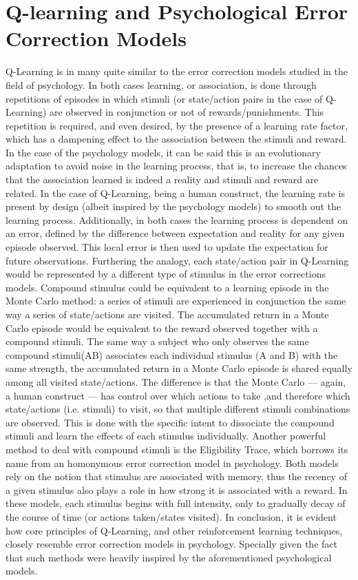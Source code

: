 \documentclass[10pt]{article}
\begin{document}
\section{Q-learning and Psychological Error Correction Models}

    Q-Learning is in many quite similar to the error correction models studied in the field of psychology. In both cases learning, or association, is done through repetitions of episodes in which stimuli (or state/action pairs in the case of Q-Learning) are observed in conjunction or not of rewards/punishments. This repetition is required, and even desired, by the presence of a learning rate factor, which has a dampening effect to the association between the stimuli and reward. In the case of the psychology models, it can be said this is an evolutionary adaptation to avoid noise in the learning process, that is, to increase the chances that the association learned is indeed a reality and stimuli and reward are related. In the case of Q-Learning, being a human construct, the learning rate is present by design (albeit inspired by the psychology models) to smooth out the learning process. Additionally, in both cases the learning process is dependent on an error, defined by the difference between expectation and reality for any given episode observed. This local error is then used to update the expectation for future observations. Furthering the analogy, each state/action pair in Q-Learning would be represented by a different type of stimulus in the error corrections models. Compound stimulus could be equivalent to a learning episode in the Monte Carlo method: a series of stimuli are experienced in conjunction the same way a series of state/actions are visited. The accumulated return in a Monte Carlo episode would be equivalent to the reward observed together with a compound stimuli. The same way a subject who only observes the same compound stimuli(AB) associates each individual stimulus (A and B) with the same strength, the accumulated return in a Monte Carlo episode is shared equally among all visited state/actions. The difference is that the Monte Carlo — again, a human construct — has control over which actions to take ,and therefore which state/actions (i.e. stimuli) to visit, so that multiple different stimuli combinations are observed. This is done with the specific intent to dissociate the compound stimuli and learn the effects of each stimulus individually. Another powerful method to deal with compound stimuli is the Eligibility Trace, which borrows its name from an homonymous error correction model in psychology. Both models rely on the notion that stimulus are associated with memory, thus the recency of a given stimulus also plays a role in how strong it is associated with a reward. In these models, each stimulus begins with full intensity, only to gradually decay of the course of time (or actions taken/states visited). In conclusion, it is evident how core principles of Q-Learning, and other reinforcement learning techniques, closely resemble error correction models in psychology. Specially given the fact that such methods were heavily inspired by the aforementioned psychological models.
\end{document}
